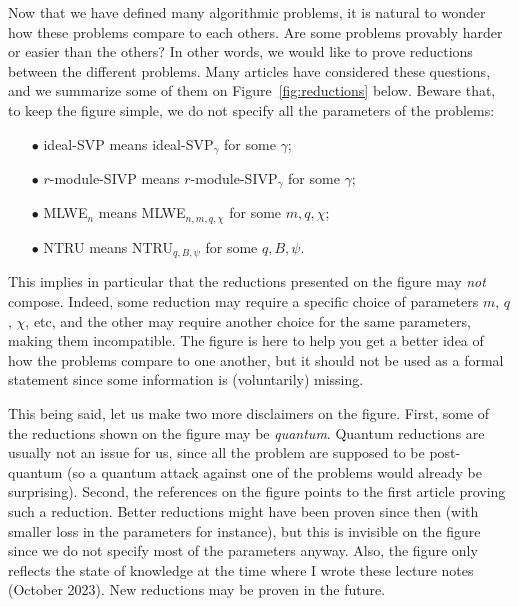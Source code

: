 Now that we have defined many algorithmic problems, it is natural to wonder how these problems compare to each others. Are some problems provably harder or easier than the others? In other words, we would like to prove reductions between the different problems. Many articles have considered these questions, and we summarize some of them on Figure~\ref{fig:reductions} below. Beware that, to keep the figure simple, we do not specify all the parameters of the problems:
\begin{itemize}
\item[$\bullet$] ideal-SVP means ideal-SVP$_\gamma$ for some $\gamma$;
\item[$\bullet$] $r$-module-SIVP means $r$-module-SIVP$_\gamma$ for some $\gamma$;
\item[$\bullet$] MLWE$_{n}$ means MLWE$_{n,m,q,\chi}$ for some $m,q,\chi$;
\item[$\bullet$] NTRU means NTRU$_{q,B,\psi}$ for some $q, B, \psi$.
\end{itemize}
This implies in particular that the reductions presented on the figure may \emph{not} compose. Indeed, some reduction may require a specific choice of parameters $m$, $q$, $\chi$, etc, and the other may require another choice for the same parameters, making them incompatible. The figure is here to help you get a better idea of how the problems compare to one another, but it should not be used as a formal statement since some information is (voluntarily) missing.

This being said, let us make two more disclaimers on the figure. First, some of the reductions shown on the figure may be \emph{quantum}. Quantum reductions are usually not an issue for us, since all the problem are supposed to be post-quantum (so a quantum attack against one of the problems would already be surprising).
Second, the references on the figure points to the first article proving such a reduction. Better reductions might have been proven since then (with smaller loss in the parameters for instance), but this is invisible on the figure since we do not specify most of the parameters anyway. Also, the figure only reflects the state of knowledge at the time where I wrote these lecture notes (October 2023). New reductions may be proven in the future.

